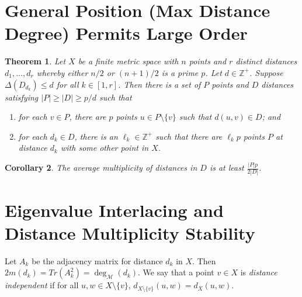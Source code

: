\documentclass[12pt]{article}
\newcommand{\Z}{\mathbb{Z}}
\newtheorem{thm}{Theorem}[section] %
\newtheorem{cor}[thm]{Corollary}
\theoremstyle{definition}
\begin{document}
	\section{General Position (Max Distance Degree) Permits Large Order}
	
	\begin{thm}
		Let $X$ be a finite metric space with $n$ points and $r$ distinct distances $d_1, \ldots, d_r$ whereby either $n/2$ or $(n+1)/2$ is a prime $p$.  Let $d \in \Z^+$.  Suppose $\Delta(D_{d_k}) \leq d$ for all $k \in [1,r]$.  Then there is a set of $P$ points and $D$ distances satisfying $|P| \geq |D| \geq p/d$ such that 
		\begin{enumerate}
			\item for each $v \in P$, there are $p$ points $u \in P \setminus \{v\}$ such that $d(u,v) \in D$; and
			\item for each $d_k \in D$, there is an $\ell_k \in \Z^+$ such that there are $\ell_k p$ points $P$ at distance $d_k$ with some other point in $X$.
		\end{enumerate}
	\end{thm}

	\begin{cor}
		The average multiplicity of distances in $D$ is at least $\frac{|P|p}{2|D|}$.
	\end{cor}
	
	\section{Eigenvalue Interlacing and Distance Multiplicity Stability}
	Let $A_k$ be the adjacency matrix for distance $d_k$ in $X$.  Then $2m(d_k) = Tr(A_k^2) = \deg_{\mathcal{M}}(d_k)$.  We say that a point $v \in X$ is \emph{distance independent} if for all $u,w \in X \setminus \{v\}$, $d_{X \setminus \{v\}}(u,w) = d_{X}(u,w)$.
	
\end{document}
